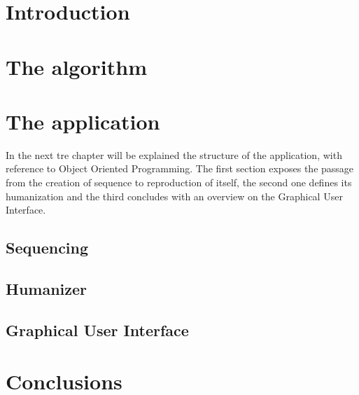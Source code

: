 \documentclass[a4paper, 12pt]{article}
\begin{document}
\section{Introduction}
\label{sec:intro}

\section{The algorithm}
\label{sec:algorithm}

\section{The application}
\label{sec:app}
In the next tre chapter will be explained the structure of the application, with reference to Object Oriented Programming. The first section exposes the passage from the creation of sequence to reproduction of itself, the second one defines its humanization and the third concludes with an overview on the Graphical User Interface.
\subsection{Sequencing}

\subsection{Humanizer}

\subsection{Graphical User Interface}

\section{Conclusions}
\label{sec:concl}


\end{document}
